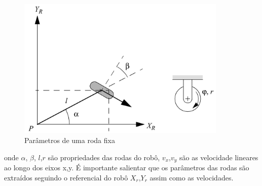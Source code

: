 \begin{figure}[H]
    \label{fig:parametros:roda:fixa}
    \centering
    \includegraphics[width=10cm]{figuras/fixed_wheel_params.png}
    \caption{Parâmetros de uma roda fixa}
\end{figure}
onde $\alpha$, $\beta$, $l$,$r$ são propriedades das rodas do robô,
$v_x$,$v_y$ são as velocidade lineares ao longo dos eixos x,y.
É importante salientar que os parâmetros das
rodas são extraídos seguindo o referencial do robô $X_r$,$Y_r$ assim como
as velocidades.
